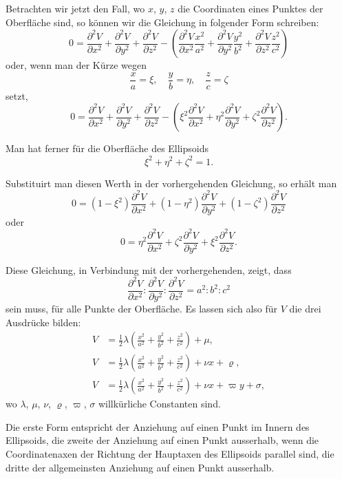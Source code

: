 \documentclass[11pt,a4paper]{article}
\begin{document}
Betrachten wir jetzt den Fall, wo $x$, $y$, $z$ die Coordinaten eines Punktes der Oberfläche sind, so können wir die Gleichung in folgender Form schreiben:
\[
0 = \frac{\partial^2 V}{\partial x^2} + \frac{\partial^2 V}{\partial y^2} + \frac{\partial^2 V}{\partial z^2} - \left( \frac{\partial^2 V}{\partial x^2} \frac{x^2}{a^2} + \frac{\partial^2 V}{\partial y^2} \frac{y^2}{b^2} + \frac{\partial^2 V}{\partial z^2} \frac{z^2}{c^2} \right)
\]
oder, wenn man der Kürze wegen
\[
\frac{x}{a} = \xi, \quad \frac{y}{b} = \eta, \quad \frac{z}{c} = \zeta
\]
setzt,
\[
0 = \frac{\partial^2 V}{\partial x^2} + \frac{\partial^2 V}{\partial y^2} + \frac{\partial^2 V}{\partial z^2} - \left( \xi^2 \frac{\partial^2 V}{\partial x^2} + \eta^2 \frac{\partial^2 V}{\partial y^2} + \zeta^2 \frac{\partial^2 V}{\partial z^2} \right).
\]

Man hat ferner für die Oberfläche des Ellipsoids
\[
\xi^2 + \eta^2 + \zeta^2 = 1.
\]

Substituirt man diesen Werth in der vorhergehenden Gleichung, so erhält man
\[
0 = (1 - \xi^2) \frac{\partial^2 V}{\partial x^2} + (1 - \eta^2) \frac{\partial^2 V}{\partial y^2} + (1 - \zeta^2) \frac{\partial^2 V}{\partial z^2}
\]
oder
\[
0 = \eta^2 \frac{\partial^2 V}{\partial x^2} + \zeta^2 \frac{\partial^2 V}{\partial y^2} + \xi^2 \frac{\partial^2 V}{\partial z^2}.
\]

Diese Gleichung, in Verbindung mit der vorhergehenden, zeigt, dass
\[
\frac{\partial^2 V}{\partial x^2} : \frac{\partial^2 V}{\partial y^2} : \frac{\partial^2 V}{\partial z^2} = a^2 : b^2 : c^2
\]
sein muss, für alle Punkte der Oberfläche. Es lassen sich also für $V$ die drei Ausdrücke bilden:
\begin{align*}
V &= \tfrac12 \lambda \left( \frac{x^2}{a^2} + \frac{y^2}{b^2} + \frac{z^2}{c^2} \right) + \mu, \\
V &= \tfrac12 \lambda \left( \frac{x^2}{a^2} + \frac{y^2}{b^2} + \frac{z^2}{c^2} \right) + \nu x + \varrho, \\
V &= \tfrac12 \lambda \left( \frac{x^2}{a^2} + \frac{y^2}{b^2} + \frac{z^2}{c^2} \right) + \nu x + \varpi y + \sigma,
\end{align*}
wo $\lambda$, $\mu$, $\nu$, $\varrho$, $\varpi$, $\sigma$ willkürliche Constanten sind.

Die erste Form entspricht der Anziehung auf einen Punkt im Innern des Ellipsoids, die zweite der Anziehung auf einen Punkt ausserhalb, wenn die Coordinatenaxen der Richtung der Hauptaxen des Ellipsoids parallel sind, die dritte der allgemeinsten Anziehung auf einen Punkt ausserhalb.
\end{document}
